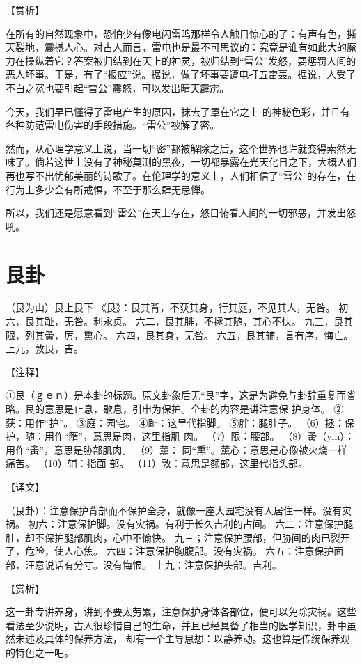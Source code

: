 \documentclass[12pt,UTF8]{ctexbook}
\begin{document}
【赏析】

在所有的自然现象中，恐怕少有像电闪雷鸣那样令人触目惊心的了：有声有色，撕天裂地，震撼人心。对古人而言，雷电也是最不可思议的：究竟是谁有如此大的魔力在操纵着它？答案被归结到在天上的神灵，被归结到“雷公”发怒，要惩罚人间的恶人坏事。于是，有了“报应”说。据说，做了坏事要遭电打五雷轰。据说，人受了不白之冤也要引起“雷公”震怒，可以发出晴天霹雳。

今天，我们早已懂得了雷电产生的原因，抹去了罩在它之上 的神秘色彩，并且有各种防范雷电伤害的手段措施。“雷公”被解了密。

然而，从心理学意义上说，当一切“密”都被解除之后，这个世界也许就变得索然无味了。倘若这世上没有了神秘莫测的黑夜，一切都暴露在光天化日之下，大概人们再也写不出忧郁美丽的诗歌了。在伦理学的意义上，人们相信了“雷公”的存在，在行为上多少会有所戒惧，不至于那么肆无忌惮。

所以，我们还是愿意看到“雷公”在天上存在，怒目俯看人间的一切邪恶，并发出怒吼。

\chapter{艮卦}

（艮为山）艮上艮下
《艮》：艮其背，不获其身，行其庭，不见其人，无咎。
初六，艮其趾，无咎。利永贞。
六二，艮其腓，不拯其随，其心不快。
九三，艮其限，列其夤，厉，熏心。
六四，艮其身，无咎。
六五，艮其辅，言有序，悔亡。
上九，敦艮，吉。

【注释】

①艮（ｇｅｎ）是本卦的标题。原文卦象后无“艮”字，这是为避免与卦辞重复而省略。艮的意思是止息，歇息，引申为保护。全卦的内容是讲注意保 护身体。
②获：用作“护”。
③庭：园宅。
④趾：这里代指脚。
⑤胖：腿肚子。
（6）拯：保护，随：用作“隋”，意思是肉，这里指肌 肉。
（7）限：腰部。
（8）夤（yin）：用作“夤”，意思是胁部肌肉。
（9）薰： 同“熏”。薰心：意思是心像被火烧一样痛苦。
（10）辅：指面 部。
（11）敦：意思是额部，这里代指头部。

【译文】

（艮卦）：注意保护背部而不保护全身，就像一座大园宅没有人居住一样。没有灾祸。
初六：注意保护脚。没有灾祸。有利于长久吉利的占间。
六二：注意保护腿肚，却不保护腿部肌肉，心中不愉快。
九三；注意保护腰部，但胁间的肉已裂开了，危险，使人心焦。
六四：注意保护胸腹部。没有灾祸。
六五：注意保护面部，汪意说话有分寸。没有悔恨。
上九：注意保护头部。吉利。

【赏析】

这一卦专讲养身，讲到不要太劳累，注意保护身体各部位，便可以免除灾祸。这些看法至少说明，古人很珍惜自己的生命，并且已经具备了相当的医学知识，卦中虽然未述及具体的保养方法， 却有一个主导思想：以静养动。这也算是传统保养观的特色之一吧。
\end{document}

